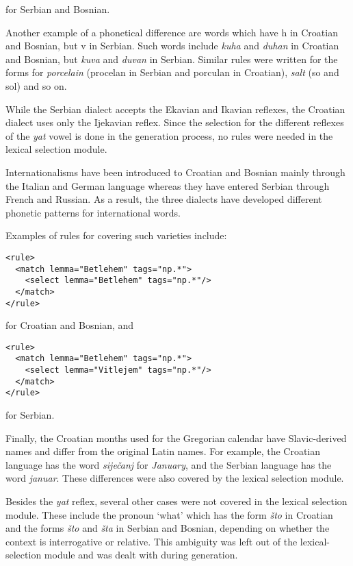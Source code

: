 for Serbian and Bosnian.

Another example of a phonetical difference are words which have h in Croatian and Bosnian, but v in Serbian.
Such words include \emph{kuha} and \emph{duhan} in Croatian and Bosnian, but \emph{kuva} and \emph{duvan} in Serbian.
Similar rules were written for the forms for \emph{porcelain} (procelan in Serbian and porculan in Croatian), 
\emph{salt} (so and sol) and so on.

While the Serbian dialect accepts the Ekavian and Ikavian reflexes, 
the Croatian dialect uses only the Ijekavian reflex.
Since the selection for the different reflexes of the \emph{yat} vowel is done in the generation process,
no rules were needed in the lexical selection module.

Internationalisms have been introduced to Croatian and Bosnian mainly through the Italian and German language
whereas they have entered Serbian through French and Russian. 
As a result, the three dialects have developed different phonetic patterns for international words.

Examples of rules for covering such varieties include:
{\small
\begin{Verbatim}
<rule>
  <match lemma="Betlehem" tags="np.*">
    <select lemma="Betlehem" tags="np.*"/>
  </match>
</rule>
\end{Verbatim}
}
for Croatian and Bosnian, and
{\small
\begin{Verbatim}
<rule>
  <match lemma="Betlehem" tags="np.*">
    <select lemma="Vitlejem" tags="np.*"/>
  </match>
</rule>
\end{Verbatim}
}
for Serbian.

Finally, the Croatian months used for the Gregorian calendar have Slavic-derived names and differ from the original Latin names.
For example, the Croatian language has the word \emph{siječanj} for \emph{January}, and 
the Serbian language has the word \emph{januar}.
These differences were also covered by the lexical selection module.

Besides the \emph{yat} reflex, several other cases were not covered in the lexical selection module. These 
include the pronoun `what' which has the form \emph{što} in Croatian and the forms \emph{što} 
and \emph{šta} in Serbian and Bosnian, depending on whether the context is interrogative or 
relative. This ambiguity was left out of the lexical-selection module and was dealt with during generation.

